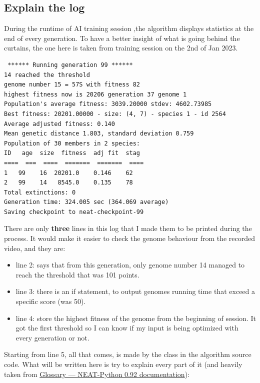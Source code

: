 \subsection{Explain the log}\label{sec:explain-the-log}

During the runtime of AI training session ,the algorithm displays statistics at the end of every generation. To have a better insight of what is going behind the curtains, the one here is taken from training session on the 2nd of Jan 2023.

\begin{listing}[H]
\begin{verbatim}
 ****** Running generation 99 ****** 
14 reached the threshold
genome number 15 = 57S with fitness 82
highest fitness now is 20206 generation 37 genome 1
Population's average fitness: 3039.20000 stdev: 4602.73985
Best fitness: 20201.00000 - size: (4, 7) - species 1 - id 2564
Average adjusted fitness: 0.140
Mean genetic distance 1.803, standard deviation 0.759
Population of 30 members in 2 species:
ID   age  size  fitness  adj fit  stag
====  ===  ====  =======  =======  ====
1   99    16  20201.0    0.146    62
2   99    14   8545.0    0.135    78
Total extinctions: 0
Generation time: 324.005 sec (364.069 average)
Saving checkpoint to neat-checkpoint-99
\end{verbatim}
\end{listing}
 There are only \textbf{three} lines in this log that I made them to be printed during the process. It would make it easier to check the genome behaviour from the recorded video, and they are:
 \begin{itemize}
\item line 2: says that from this generation, only genome number 14 managed to reach the threshold that was 101 points.
\item line 3: there is an if statement, to output genomes running time that exceed a specific score (was 50).
\item line 4: store the highest fitness of the genome from the beginning of session. It got the first threshold so I can know if my input is being optimized with every generation or not.
 \end{itemize}

Starting from line 5, all that comes, is made by the  class in the algorithm source code. What will be written here is try to explain every part of it (and heavily taken from \href{https://neat-python.readthedocs.io/en/latest/glossary.html}{Glossary — NEAT-Python 0.92 documentation}):


